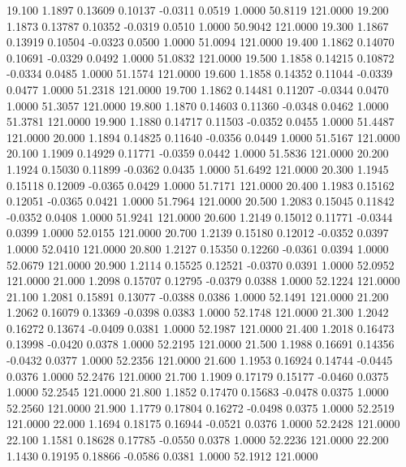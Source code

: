   19.100   1.1897   0.13609   0.10137  -0.0311   0.0519   1.0000  50.8119 121.0000
  19.200   1.1873   0.13787   0.10352  -0.0319   0.0510   1.0000  50.9042 121.0000
  19.300   1.1867   0.13919   0.10504  -0.0323   0.0500   1.0000  51.0094 121.0000
  19.400   1.1862   0.14070   0.10691  -0.0329   0.0492   1.0000  51.0832 121.0000
  19.500   1.1858   0.14215   0.10872  -0.0334   0.0485   1.0000  51.1574 121.0000
  19.600   1.1858   0.14352   0.11044  -0.0339   0.0477   1.0000  51.2318 121.0000
  19.700   1.1862   0.14481   0.11207  -0.0344   0.0470   1.0000  51.3057 121.0000
  19.800   1.1870   0.14603   0.11360  -0.0348   0.0462   1.0000  51.3781 121.0000
  19.900   1.1880   0.14717   0.11503  -0.0352   0.0455   1.0000  51.4487 121.0000
  20.000   1.1894   0.14825   0.11640  -0.0356   0.0449   1.0000  51.5167 121.0000
  20.100   1.1909   0.14929   0.11771  -0.0359   0.0442   1.0000  51.5836 121.0000
  20.200   1.1924   0.15030   0.11899  -0.0362   0.0435   1.0000  51.6492 121.0000
  20.300   1.1945   0.15118   0.12009  -0.0365   0.0429   1.0000  51.7171 121.0000
  20.400   1.1983   0.15162   0.12051  -0.0365   0.0421   1.0000  51.7964 121.0000
  20.500   1.2083   0.15045   0.11842  -0.0352   0.0408   1.0000  51.9241 121.0000
  20.600   1.2149   0.15012   0.11771  -0.0344   0.0399   1.0000  52.0155 121.0000
  20.700   1.2139   0.15180   0.12012  -0.0352   0.0397   1.0000  52.0410 121.0000
  20.800   1.2127   0.15350   0.12260  -0.0361   0.0394   1.0000  52.0679 121.0000
  20.900   1.2114   0.15525   0.12521  -0.0370   0.0391   1.0000  52.0952 121.0000
  21.000   1.2098   0.15707   0.12795  -0.0379   0.0388   1.0000  52.1224 121.0000
  21.100   1.2081   0.15891   0.13077  -0.0388   0.0386   1.0000  52.1491 121.0000
  21.200   1.2062   0.16079   0.13369  -0.0398   0.0383   1.0000  52.1748 121.0000
  21.300   1.2042   0.16272   0.13674  -0.0409   0.0381   1.0000  52.1987 121.0000
  21.400   1.2018   0.16473   0.13998  -0.0420   0.0378   1.0000  52.2195 121.0000
  21.500   1.1988   0.16691   0.14356  -0.0432   0.0377   1.0000  52.2356 121.0000
  21.600   1.1953   0.16924   0.14744  -0.0445   0.0376   1.0000  52.2476 121.0000
  21.700   1.1909   0.17179   0.15177  -0.0460   0.0375   1.0000  52.2545 121.0000
  21.800   1.1852   0.17470   0.15683  -0.0478   0.0375   1.0000  52.2560 121.0000
  21.900   1.1779   0.17804   0.16272  -0.0498   0.0375   1.0000  52.2519 121.0000
  22.000   1.1694   0.18175   0.16944  -0.0521   0.0376   1.0000  52.2428 121.0000
  22.100   1.1581   0.18628   0.17785  -0.0550   0.0378   1.0000  52.2236 121.0000
  22.200   1.1430   0.19195   0.18866  -0.0586   0.0381   1.0000  52.1912 121.0000
